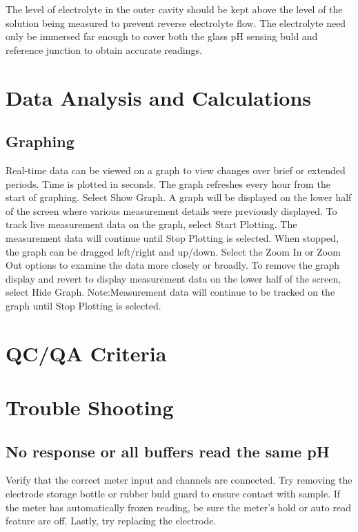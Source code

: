 \documentclass[12pt]{../SOP3_beta}\usepackage[]{graphicx}\usepackage[]{color}
\begin{document}
\NP The level of electrolyte in the outer cavity should be kept above the level of the solution being measured to prevent reverse electrolyte flow. The electrolyte need only be immersed far enough to cover both the glass pH sensing buld and reference junction to obtain accurate readings.

\section{Data Analysis and Calculations}

\subsection{Graphing}
\NP Real-time data can be viewed on a graph to view changes over brief or  extended  periods. Time  is  plotted  in  seconds. The  graph  refreshes  every  hour  from  the  start of graphing.
\NP Select Show Graph. A graph will be displayed on the lower half of the screen where various measurement details were previously displayed.  
\NP To track live measurement data on the graph, select 
Start Plotting. The measurement data will continue until 
Stop Plotting is selected. When stopped, the graph can be dragged left/right and up/down.
\NP Select the Zoom In or Zoom Out options to examine the data more closely or broadly.
\NP To remove the graph display and revert to display measurement data on the lower half of the screen, select Hide Graph. Note:Measurement  data  will  continue  to  be  tracked  on  the  graph  until  Stop  Plotting is  selected.  

\section{QC/QA Criteria}

\section{Trouble Shooting}

\subsection{No response or all buffers read the same pH}

\NP Verify that the correct meter input and channels are connected. Try removing the electrode storage bottle or rubber buld guard to ensure contact with sample. If the meter has automatically frozen reading, be sure the meter's hold or auto read feature are off. Lastly, try replacing the electrode.  
\end{document}
